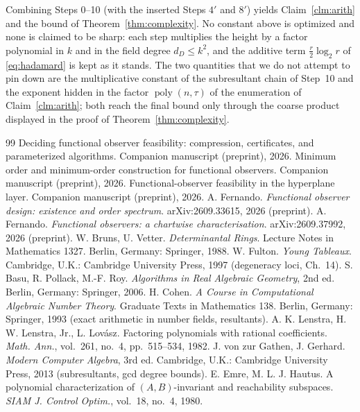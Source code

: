 \documentclass[journal]{IEEEtran}
\theoremstyle{plainn}
\theoremstyle{remark}
\newcommand{\poly}{\operatorname{poly}}
\begin{document}
Combining Steps 0--10 (with the inserted Steps $4'$ and $8'$) yields Claim~\ref{clm:arith} and the bound of
Theorem~\ref{thm:complexity}. No constant above is optimized and none is claimed to be sharp: each step
multiplies the height by a factor polynomial in $k$ and in the field degree $d_D\le k^2$, and the
additive term $\tfrac{r}{2}\log_2 r$ of \eqref{eq:hadamard} is kept as it stands. The two
quantities that we do not attempt to pin down are the multiplicative constant of the subresultant chain of
Step~10 and the exponent hidden in the factor $\poly(n,\tau)$ of the enumeration of
Claim~\ref{clm:arith}; both reach the final bound only through the coarse product displayed in the proof of
Theorem~\ref{thm:complexity}.

\normalsize

\begin{thebibliography}{99}
 Deciding functional observer feasibility: compression, certificates, and
parameterized algorithms. Companion manuscript (preprint), 2026.
 Minimum order and minimum-order construction for functional observers. Companion
manuscript (preprint), 2026.
 Functional-observer feasibility in the hyperplane layer. Companion manuscript
(preprint), 2026.
 A. Fernando. \emph{Functional observer design: existence and order spectrum}.
arXiv:2609.33615, 2026 (preprint).
 A. Fernando. \emph{Functional observers: a chartwise characterisation}. arXiv:2609.37992,
2026 (preprint).
 W. Bruns, U. Vetter. \emph{Determinantal Rings}. Lecture Notes in Mathematics 1327.
Berlin, Germany: Springer, 1988.
 W. Fulton. \emph{Young Tableaux}. Cambridge, U.K.: Cambridge University Press, 1997
(degeneracy loci, Ch.~14).
 S. Basu, R. Pollack, M.-F. Roy. \emph{Algorithms in Real Algebraic Geometry}, 2nd ed.
Berlin, Germany: Springer, 2006.
 H. Cohen. \emph{A Course in Computational Algebraic Number Theory}. Graduate Texts in
Mathematics 138. Berlin, Germany: Springer, 1993 (exact arithmetic in number fields, resultants).
 A. K. Lenstra, H. W. Lenstra, Jr., L. Lovász. Factoring polynomials with rational
coefficients. \emph{Math. Ann.}, vol.~261, no.~4, pp.~515--534, 1982.
 J. von zur Gathen, J. Gerhard. \emph{Modern Computer Algebra}, 3rd ed. Cambridge, U.K.:
Cambridge University Press, 2013 (subresultants, gcd degree bounds).
 E. Emre, M. L. J. Hautus. A polynomial characterization of $(A,B)$-invariant and
reachability subspaces. \emph{SIAM J. Control Optim.}, vol.~18, no.~4, 1980.
\end{thebibliography}
\end{document}
